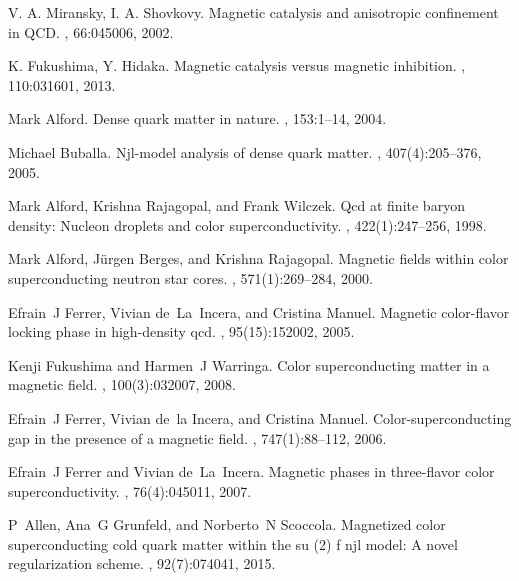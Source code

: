 \documentclass[prd, showpacs,nofootinbib,amsmath,amssymb]{revtex4}
\begin{document}
\begin{thebibliography}{99}
V. A. Miransky, I. A. Shovkovy. 
\newblock Magnetic catalysis and anisotropic confinement in QCD.
, 66:045006, 2002.

K. Fukushima, Y. Hidaka. 
\newblock Magnetic catalysis versus magnetic inhibition.
, 110:031601, 2013.

Mark Alford.
\newblock Dense quark matter in nature.
, 153:1--14, 2004.

Michael Buballa.
\newblock Njl-model analysis of dense quark matter.
, 407(4):205--376, 2005.

Mark Alford, Krishna Rajagopal, and Frank Wilczek.
\newblock Qcd at finite baryon density: Nucleon droplets and color
  superconductivity.
, 422(1):247--256, 1998.

Mark Alford, J{\"u}rgen Berges, and Krishna Rajagopal.
\newblock Magnetic fields within color superconducting neutron star cores.
, 571(1):269--284, 2000.

Efrain~J Ferrer, Vivian de~La~Incera, and Cristina Manuel.
\newblock Magnetic color-flavor locking phase in high-density qcd.
, 95(15):152002, 2005.

Kenji Fukushima and Harmen~J Warringa.
\newblock Color superconducting matter in a magnetic field.
, 100(3):032007, 2008.

Efrain~J Ferrer, Vivian de~la Incera, and Cristina Manuel.
\newblock Color-superconducting gap in the presence of a magnetic field.
, 747(1):88--112, 2006.

Efrain~J Ferrer and Vivian de~La~Incera.
\newblock Magnetic phases in three-flavor color superconductivity.
, 76(4):045011, 2007.

P~Allen, Ana~G Grunfeld, and Norberto~N Scoccola.
\newblock Magnetized color superconducting cold quark matter within the su (2)
  f njl model: A novel regularization scheme.
, 92(7):074041, 2015.


\end{thebibliography}
\end{document}
